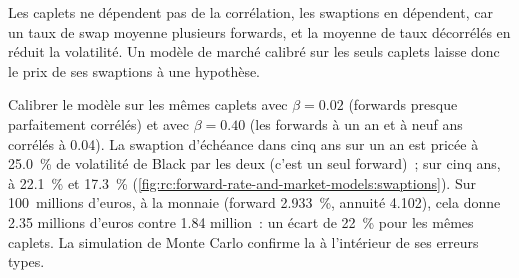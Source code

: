 Les caplets ne dépendent pas de la corrélation, les swaptions en dépendent, car un taux de swap moyenne
plusieurs forwards, et la moyenne de taux décorrélés en réduit la volatilité. Un modèle de marché
calibré sur les seuls caplets laisse donc le prix de ses swaptions à
une hypothèse.

\begin{example}\label{ex:rc:forward-rate-and-market-models:corr}
Calibrer le modèle sur les mêmes caplets avec $\beta=0.02$ (forwards presque
parfaitement corrélés) et avec $\beta=0.40$ (les forwards à un an et à neuf ans
corrélés à 0.04). La swaption d'échéance dans cinq ans sur un an est
pricée à 25.0~\% de volatilité de Black par les deux (c'est un seul forward)~; sur cinq ans,
à 22.1~\% et 17.3~\% (\cref{fig:rc:forward-rate-and-market-models:swaptions}). Sur
100~millions d'euros, à la monnaie (forward 2.933~\%, annuité 4.102), cela donne 2.35
millions d'euros contre 1.84 million~: un écart de 22~\% pour les mêmes caplets. La simulation de
Monte Carlo confirme la  à l'intérieur de ses erreurs types.
\end{example}

\begin{omfigure}

\label{fig:rc:forward-rate-and-market-models:corrplot}
\end{omfigure}

